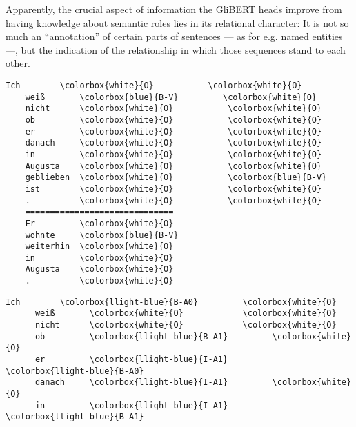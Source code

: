 {Apparently, the crucial aspect of information the GliBERT heads improve from having knowledge
about semantic roles lies in its relational character: It is not so much an ``annotation''
of certain parts of sentences --- as for e.g. named entities ---, but the indication of the
relationship in which those sequences stand to each other.

\begingroup
\begin{srl}[!h]
\centering
  \begin{minipage}{0.45\linewidth}
  \vspace{0pt}
    \begin{BVerbatim}[commandchars=\\\{\}, fontsize=\footnotesize]
    Ich        \colorbox{white}{O}           \colorbox{white}{O}
    weiß       \colorbox{blue}{B-V}         \colorbox{white}{O}
    nicht      \colorbox{white}{O}           \colorbox{white}{O}
    ob         \colorbox{white}{O}           \colorbox{white}{O}
    er         \colorbox{white}{O}           \colorbox{white}{O}
    danach     \colorbox{white}{O}           \colorbox{white}{O}
    in         \colorbox{white}{O}           \colorbox{white}{O}
    Augusta    \colorbox{white}{O}           \colorbox{white}{O}
    geblieben  \colorbox{white}{O}           \colorbox{blue}{B-V}
    ist        \colorbox{white}{O}           \colorbox{white}{O}
    .          \colorbox{white}{O}           \colorbox{white}{O}
    ==============================
    Er         \colorbox{white}{O}
    wohnte     \colorbox{blue}{B-V}
    weiterhin  \colorbox{white}{O}
    in         \colorbox{white}{O}
    Augusta    \colorbox{white}{O}
    .          \colorbox{white}{O}
    \end{BVerbatim}
  \end{minipage}
  \hfill
  \begin{minipage}{0.45\linewidth}
  \vspace{0pt}
    \begin{BVerbatim}[commandchars=\\\{\}, fontsize=\footnotesize]
      Ich        \colorbox{llight-blue}{B-A0}         \colorbox{white}{O}
      weiß       \colorbox{white}{O}            \colorbox{white}{O}
      nicht      \colorbox{white}{O}            \colorbox{white}{O}
      ob         \colorbox{llight-blue}{B-A1}         \colorbox{white}{O}
      er         \colorbox{llight-blue}{I-A1}         \colorbox{llight-blue}{B-A0}
      danach     \colorbox{llight-blue}{I-A1}         \colorbox{white}{O}
      in         \colorbox{llight-blue}{I-A1}         \colorbox{llight-blue}{B-A1}

\end{BVerbatim}
\end{minipage}
\end{srl}}
